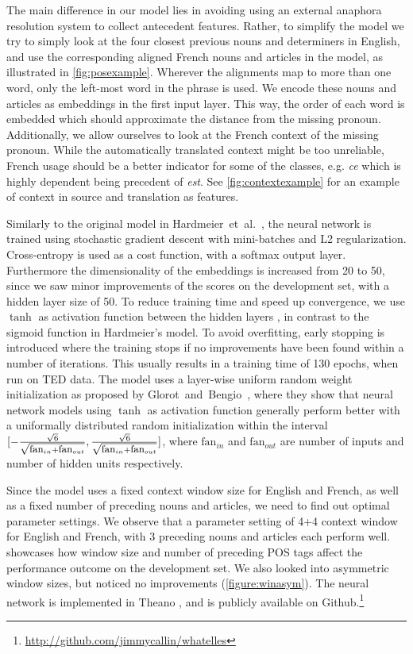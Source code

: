 \documentclass[11pt]{article}
\begin{document}
The main difference in our model lies in avoiding using an external anaphora resolution system to collect antecedent features.
Rather, to simplify the model we try to simply look at the four closest previous nouns and determiners in English, and use the corresponding aligned French nouns and articles in the model, as illustrated in \cref{fig:posexample}.
Wherever the alignments map to more than one word, only the left-most word in the phrase is used.
We encode these nouns and articles as embeddings in the first input layer. This way, the order of each word is embedded which should approximate the distance from the missing pronoun.
Additionally, we allow ourselves to look at the French context of the missing pronoun.
While the automatically translated context might be too unreliable, French usage should be a better indicator for some of the classes, e.g. \emph{ce} which is highly dependent being precedent of \emph{est}.
See \cref{fig:contextexample} for an example of context in source and translation as features.

Similarly to the original model in Hardmeier~et~al.~, the neural network is trained using stochastic gradient descent with mini-batches and L2 regularization.
Cross-entropy is used as a cost function, with a softmax output layer.
Furthermore the dimensionality of the embeddings is increased from 20 to 50, since we saw minor improvements of the scores on the development set, with a hidden layer size of 50.
To reduce training time and speed up convergence, we use $\tanh$ as activation function between the hidden layers \cite{Lecun2012Efficient}, in contrast to the sigmoid function in Hardmeier's model.
To avoid overfitting, early stopping is introduced where the training stops if no improvements have been found within a number of iterations.
This usually results in a training time of 130 epochs, when run on TED data.
The model uses a layer-wise uniform random weight initialization as proposed by Glorot~and~Bengio~, where they show that neural network models using $\tanh$ as activation function generally perform better with a uniformally distributed random initialization within the interval $[-\frac{\sqrt{6}}{\sqrt{\mbox{\small fan}_{in}+\mbox{\small fan}_{out}}},\frac{\sqrt{6}}{\sqrt{\mbox{\small fan}_{in}+\mbox{\small fan}_{out}}}]$, where $\mbox{fan}_{in}$ and $\mbox{fan}_{out}$ are number of inputs and number of hidden units respectively.

Since the model uses a fixed context window size for English and French, as well as a fixed number of preceding nouns and articles, we need to find out optimal parameter settings. We observe that a parameter setting of 4+4 context window for English and French, with 3 preceding nouns and articles each perform well.  showcases how window size and number of preceding POS tags affect the performance outcome on the development set. We also looked into asymmetric window sizes, but noticed no improvements (\cref{figure:winasym}).
The neural network is implemented in Theano \cite{Bergstra2010Theano}, and is publicly available on Github.\footnote{\url{http://github.com/jimmycallin/whatelles}}
\end{document}
